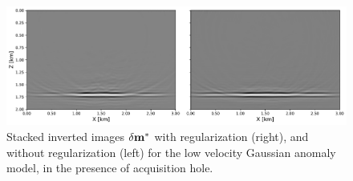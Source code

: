 \begin{figure}[h]
\centering
\includegraphics[width=\linewidth]{Fig/anomaly-hole-inverted-image-stack-comp.pdf}

\vspace*{-0.5cm}
\caption{Stacked inverted images $\delta \mathbf{m}^{\ast}$ with regularization (right), and without regularization (left) for the low velocity Gaussian anomaly model, in the presence of acquisition hole.}
\label{fig:example2_images_stacks}
\end{figure}